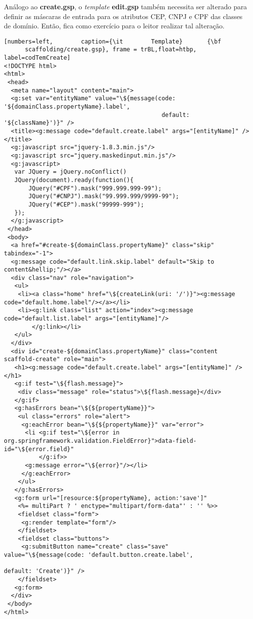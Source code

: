 \vspace{0.3cm}

\begin{remark}
Análogo ao  {\bf create.gsp}, o  {\it template} {\bf edit.gsp}  também necessita
ser alterado para  definir as máscaras de entrada para os  atributos CEP, CNPJ e
CPF das classes  de domínio.  Então, fica como exercício  para o leitor realizar
tal alteração.
\end{remark}

\begin{lstlisting}[numbers=left,        caption={\it        Template}       {\bf
      scaffolding/create.gsp}, frame = trBL,float=htbp, label=codTemCreate] 
<!DOCTYPE html>
<html>
 <head>
  <meta name="layout" content="main">
  <g:set var="entityName" value="\${message(code: '${domainClass.propertyName}.label', 
                                             default: '${className}')}" />
  <title><g:message code="default.create.label" args="[entityName]" /></title>
  <g:javascript src="jquery-1.8.3.min.js"/>
  <g:javascript src="jquery.maskedinput.min.js"/> 
  <g:javascript>
   var JQuery = jQuery.noConflict()
   JQuery(document).ready(function(){
       JQuery("#CPF").mask("999.999.999-99");
       JQuery("#CNPJ").mask("99.999.999/9999-99");
       JQuery("#CEP").mask("99999-999");
   });
  </g:javascript>
 </head>
 <body>
  <a href="#create-${domainClass.propertyName}" class="skip" tabindex="-1">
  <g:message code="default.link.skip.label" default="Skip to content&hellip;"/></a>
  <div class="nav" role="navigation">
   <ul>
    <li><a class="home" href="\${createLink(uri: '/')}"><g:message code="default.home.label"/></a></li>
    <li><g:link class="list" action="index"><g:message code="default.list.label" args="[entityName]"/>
        </g:link></li>
   </ul>
  </div>
  <div id="create-${domainClass.propertyName}" class="content scaffold-create" role="main">
   <h1><g:message code="default.create.label" args="[entityName]" /></h1>
   <g:if test="\${flash.message}">
    <div class="message" role="status">\${flash.message}</div>
   </g:if>
   <g:hasErrors bean="\${${propertyName}}">
    <ul class="errors" role="alert">
     <g:eachError bean="\${${propertyName}}" var="error">
      <li <g:if test="\${error in org.springframework.validation.FieldError}">data-field-id="\${error.field}"
          </g:if>>
      <g:message error="\${error}"/></li>
     </g:eachError>
    </ul>
   </g:hasErrors>
   <g:form url="[resource:${propertyName}, action:'save']" 
    <%= multiPart ? ' enctype="multipart/form-data"' : '' %>>
    <fieldset class="form">
     <g:render template="form"/>
    </fieldset>
    <fieldset class="buttons">
     <g:submitButton name="create" class="save" value="\${message(code: 'default.button.create.label', 
                                                                  default: 'Create')}" />
    </fieldset>
   <g:form>
  </div>
 </body>
</html>
\end{lstlisting}

